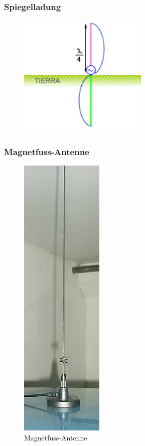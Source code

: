 \begin{frame}
  \frametitle{Spiegelladung}
  \begin{center}
    \begin{figure}
      \includegraphics[width=0.55\textwidth,height=.75\textheight,keepaspectratio]{e11/Antena_marconi501.png}
    \end{figure}
  \end{center}
\end{frame}

\begin{frame}
  \frametitle{Magnetfuss-Antenne}
  \begin{center}
    \begin{figure}
      \includegraphics[height=0.8\textheight,height=.75\textheight,keepaspectratio]{e11/magnetfuss.jpg}
      \caption{Magnetfuss-Antenne}
    \end{figure}
  \end{center}
\end{frame}

